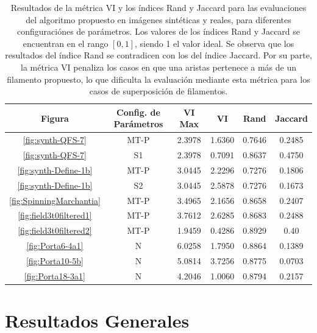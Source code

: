\begin{table}[h]
\centering
\begin{tabular}{|c|c|c|c|c|c|}
\hline
Figura & Config. de Par\'ametros & VI Max & VI & Rand & Jaccard \\ \hline
 \ref{fig:synth-QFS-7} & MT-P  & 2.3978 & 1.6360 & 0.7646 & 0.2485 \\
 \ref{fig:synth-QFS-7} & S1  & 2.3978 & 0.7091 & 0.8637 & 0.4750  \\
 \ref{fig:synth-Define-1b} & MT-P & 3.0445 & 2.2296 & 0.7276 & 0.1806 \\
 \ref{fig:synth-Define-1b} & S2 & 3.0445 & 2.5878 & 0.7276 & 0.1673  \\
 \ref{fig:SpinningMarchantia} & MT-P & 3.4965 & 2.1656 & 0.8658 & 0.2407 \\
 \ref{fig:field3t0filtered1} & MT-P & 3.7612 & 2.6285 & 0.8683 & 0.2488  \\
 \ref{fig:field3t0filtered2} & MT-P & 1.9459 & 0.4286 & 0.8929 & 0.40 \\
 \ref{fig:Porta6-4a1} & N & 6.0258 & 1.7950 & 0.8864 & 0.1389 \\
 \ref{fig:Porta10-5b} & N & 5.0814 & 3.7256 & 0.8775 & 0.0703 \\
 \ref{fig:Porta18-3a1} & N & 4.2046 & 1.0060 & 0.8794 & 0.2157 \\ \hline
\end{tabular}
\caption[Resultados de la m\'etrica VI y los \'indices Rand y Jaccard para las evaluaciones del algoritmo propuesto.]{Resultados de la m\'etrica VI y los \'indices Rand y Jaccard para las evaluaciones del algoritmo propuesto en im\'agenes sint\'eticas y reales, para diferentes configuraci\'ones de par\'ametros. Los valores de los \'indices Rand y Jaccard se encuentran en el rango $[0,1]$, siendo 1 el valor ideal. Se observa que los resultados del \'indice Rand se contradicen con los del \'indice Jaccard. Por su parte, la m\'etrica VI penaliza los casos en que una aristas pertenece a m\'as de un filamento propuesto, lo que dificulta la evaluaci\'on mediante esta m\'etrica para los casos de superposici\'on de filamentos.}
\label{tab:VI-R-J-inconclu}
\end{table}


\section{Resultados Generales}

